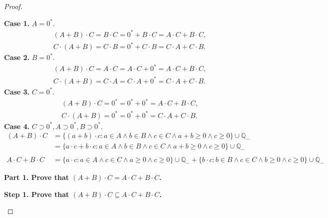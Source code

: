 \begin{proof}
\begin{enumerate}[label={(F\arabic*)}, start=5]
              \textbf{Case 1.} $A = {0}^{*}$.
              \[
                  \begin{split}
                      (A + B)\cdot C = B\cdot C = {0}^{*} + B\cdot C = A\cdot C + B\cdot C, \\
                      C\cdot (A + B) = C\cdot B = {0}^{*} + C\cdot B = C\cdot A + C\cdot B.
                  \end{split}
              \]
              \textbf{Case 2.} $B = {0}^{*}$.
              \[
                  \begin{split}
                      (A + B)\cdot C = A\cdot C = A\cdot C + {0}^{*} = A\cdot C + B\cdot C, \\
                      C\cdot (A + B) = C\cdot A = C\cdot A + {0}^{*} = C\cdot A + C\cdot B.
                  \end{split}
              \]
              \textbf{Case 3.} $C = {0}^{*}$.
              \[
                  \begin{split}
                      (A + B)\cdot C = {0}^{*} = {0}^{*} + {0}^{*} = A\cdot C + B\cdot C, \\
                      C\cdot (A + B) = {0}^{*} = {0}^{*} + {0}^{*} = C\cdot A + C\cdot B.
                  \end{split}
              \]
              \textbf{Case 4.} $C\supset {0}^{*}, A\supset {0}^{*}, B\supset {0}^{*}$.
              \begin{align*}
                  (A + B)\cdot C      & = \{ (a + b)\cdot c : a\in A\land b\in B\land c\in C\land a+b\ge 0\land c\ge 0 \} \cup\mathbb{Q}_{-}                                                              \\
                                      & = \{ a\cdot c + b\cdot c : a\in A\land b\in B\land c\in C\land a+b\ge 0\land c\ge 0 \} \cup\mathbb{Q}_{-}                                                         \\
                  \\
                  A\cdot C + B\cdot C & = \{ a\cdot c : a\in A\land c\in C\land a\ge 0\land c\ge 0 \} \cup\mathbb{Q}_{-} + \{ b\cdot c : b\in B\land c\in C\land b\ge 0\land c\ge 0 \} \cup\mathbb{Q}_{-}
              \end{align*}

              \textbf{Part 1. Prove that $(A + B)\cdot C = A\cdot C + B\cdot C$.}

              \textbf{Step 1. Prove that $(A + B)\cdot C\subseteq A\cdot C + B\cdot C$.}


\end{enumerate}
\end{proof}
